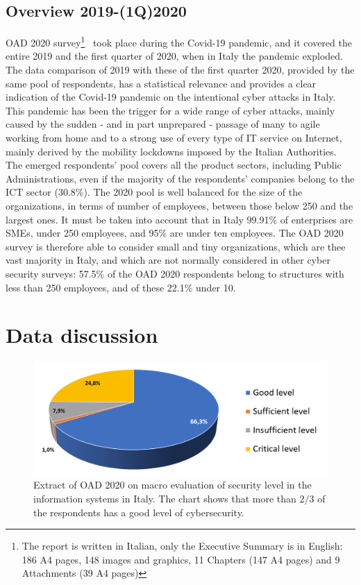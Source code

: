 \documentclass{easychair}
\begin{document}
\subsection{Overview 2019-(1Q)2020}

OAD 2020 survey\footnote{The report is written in Italian, only the Executive Summary is in English: 186 A4 pages, 148 images and graphics, 11 Chapters
(147 A4 pages) and 9 Attachments (39 A4 pages)}~\cite{oad20} took place during the Covid-19 pandemic, and it covered the entire 2019 and the first quarter 
of 2020, when in Italy the pandemic exploded. The data comparison of 2019 with these of the first quarter 2020, provided by the same pool of respondents, has a statistical relevance and provides a 
clear indication of the Covid-19 pandemic on the intentional cyber attacks in Italy. This pandemic has been the trigger for a wide range of cyber attacks, mainly 
caused by the sudden - and in part unprepared - passage of many to agile working from home and to a strong use of every type of IT service on Internet, mainly
derived by the mobility lockdowns imposed by the Italian Authorities. The emerged respondents’ pool covers all the product sectors, including Public Administrations,
even if the majority of the respondents’ companies belong to the ICT sector (30.8\%). The 2020 pool  is well balanced for the size of the organizations, in terms
of number of employees, between those below 250 and the largest ones. It must be taken into account that in Italy 99.91\% \cite{istat20} %
of enterprises are SMEs, under 250 employees, and 95\% are under ten employees. The OAD 2020 survey is therefore able to consider small and 
tiny organizations, which are thee vast majority in Italy, and which are not normally considered in other cyber security surveys: 57.5\% of the OAD 2020 respondents
belong to structures with less than 250 employees, and of these 22.1\% under 10. 

\section{Data discussion}\label{sec:DataDiscussion}

\begin{figure}
	\centering
		\includegraphics[width=1\textwidth]{pictures/fig1.png}
		\caption{Extract of OAD 2020 \cite{oad20} on macro evaluation of security level in the information systems in Italy. The chart shows that more than $ 2/3 $ of the respondents has a good level of cybersecurity.}
		\label{fig:1}
\end{figure}
\end{document}
